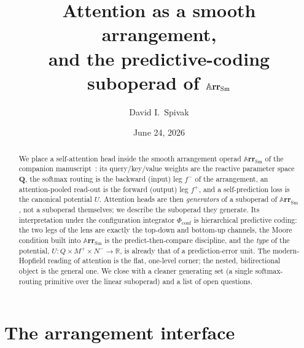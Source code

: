 \documentclass[11pt]{article}
\title{Attention as a smooth arrangement,\\
       and the predictive-coding suboperad of $\sarr$}
\author{David I.\ Spivak}
\date{June 24, 2026}
\theoremstyle{plain}
\theoremstyle{definition}
\theoremstyle{remark}
\newcommand{\rr}{\mathbb{R}}
\newcommand{\Cat}[1]{\mathbf{#1}}
\newcommand{\Sm}{\mathrm{Sm}}
\newcommand{\arr}{\mathbb{A}\Cat{rr}}    %
\newcommand{\sarr}{\arr_{\Sm}}           %
\newcommand{\rv}[1]{\mathbf{#1}}         %
\newcommand{\sharpR}{\sharp}
\newcommand{\inpt}[1]{#1^{-}}
\newcommand{\outp}[1]{#1^{+}}
\newcommand{\conf}{\mathrm{conf}}
\newcommand{\Phiconf}{\Phi_{\conf}}
\begin{document}
\maketitle

\begin{abstract}
We place a self-attention head inside the smooth arrangement operad
$\sarr$ of the companion manuscript~\cite{DAP}: its query/key/value
weights are the reactive parameter space $\rv Q$, the softmax routing is
the backward (input) leg $\inpt f$ of the arrangement, an attention-pooled
read-out is the forward (output) leg $\outp f$, and a self-prediction loss
is the canonical potential $U$. Attention heads are then \emph{generators}
of a suboperad of $\sarr$, not a suboperad themselves; we describe the
suboperad they generate. Its interpretation under the configuration
integrator $\Phiconf$ is hierarchical predictive coding: the two legs of
the lens are exactly the top-down and bottom-up channels, the Moore
condition built into $\sarr$ is the predict-then-compare discipline, and
the \emph{type} of the potential, $U\colon Q\times\outp M\times\inpt N\to\rr$,
is already that of a prediction-error unit. The modern-Hopfield reading of
attention is the flat, one-level corner; the nested, bidirectional object
is the general one. We close with a cleaner generating set (a single
softmax-routing primitive over the linear suboperad) and a list of
open questions.
\end{abstract}

\tableofcontents

\section{The arrangement interface}\label{sec.interface}
\end{document}
